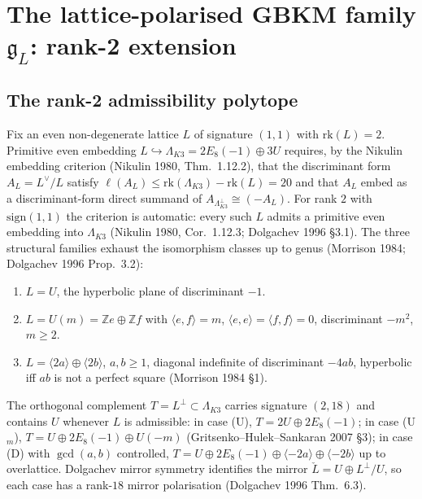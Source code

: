 \providecommand{\K}{\mathbf{k}}
\providecommand{\Z}{\mathbb{Z}}
\providecommand{\Q}{\mathbb{Q}}
\providecommand{\C}{\mathbb{C}}
\providecommand{\HH}{\mathbb{H}}
\providecommand{\gfrak}{\mathfrak{g}}
\providecommand{\hfrak}{\mathfrak{h}}
\providecommand{\Pic}{\mathrm{Pic}}
\providecommand{\Sig}{\mathrm{sign}}
\providecommand{\Om}{\Omega}
\providecommand{\disc}{\mathrm{disc}}
\providecommand{\rk}{\mathrm{rk}}
\providecommand{\Aut}{\mathrm{Aut}}
\providecommand{\Oneg}{\mathrm{O}^+}
\providecommand{\Jac}{J_{\mathrm{cusp}}}
\providecommand{\LamK}{\Lambda_{K3}}

\section*{The lattice-polarised GBKM family $\gfrak_L$: rank-2 extension}

\subsection*{The rank-2 admissibility polytope}

Fix an even non-degenerate lattice $L$ of signature $(1, 1)$ with $\rk(L) = 2$.
Primitive even embedding $L \hookrightarrow \LamK = 2 E_8(-1) \oplus 3 U$
requires, by the Nikulin embedding criterion (Nikulin 1980, Thm.~1.12.2),
that the discriminant form $A_L = L^\vee / L$ satisfy
$\ell(A_L) \leq \rk(\LamK) - \rk(L) = 20$ and that $A_L$ embed as a
discriminant-form direct summand of $A_{\LamK^\perp} \cong (-A_L)$. For
rank $2$ with $\Sig(1,1)$ the criterion is automatic: every such $L$ admits
a primitive even embedding into $\LamK$ (Nikulin 1980, Cor.~1.12.3;
Dolgachev 1996 \S3.1). The three structural families exhaust the
isomorphism classes up to genus (Morrison 1984; Dolgachev 1996 Prop.~3.2):

\begin{enumerate}
\item[\textbf{(U)}] $L = U$, the hyperbolic plane of discriminant $-1$.
\item[\textbf{(U$_m$)}] $L = U(m) = \Z e \oplus \Z f$ with
$\langle e, f \rangle = m$, $\langle e, e \rangle = \langle f, f \rangle = 0$,
discriminant $-m^2$, $m \geq 2$.
\item[\textbf{(D)}] $L = \langle 2a \rangle \oplus \langle 2b \rangle$, $a, b \geq 1$,
diagonal indefinite of discriminant $-4ab$, hyperbolic iff $ab$ is not a
perfect square (Morrison 1984 \S1).
\end{enumerate}

The orthogonal complement $T = L^\perp \subset \LamK$ carries signature
$(2, 18)$ and contains $U$ whenever $L$ is admissible: in case (U),
$T = 2 U \oplus 2 E_8(-1)$; in case (U$_m$), $T = U \oplus 2 E_8(-1) \oplus U(-m)$
(Gritsenko--Hulek--Sankaran 2007 \S3); in case (D) with $\gcd(a,b)$ controlled,
$T = U \oplus 2 E_8(-1) \oplus \langle -2a \rangle \oplus \langle -2b \rangle$
up to overlattice. Dolgachev mirror symmetry identifies the mirror
$\check L = U \oplus L^\perp / U$, so each case has a rank-$18$ mirror
polarisation (Dolgachev 1996 Thm.~6.3).

